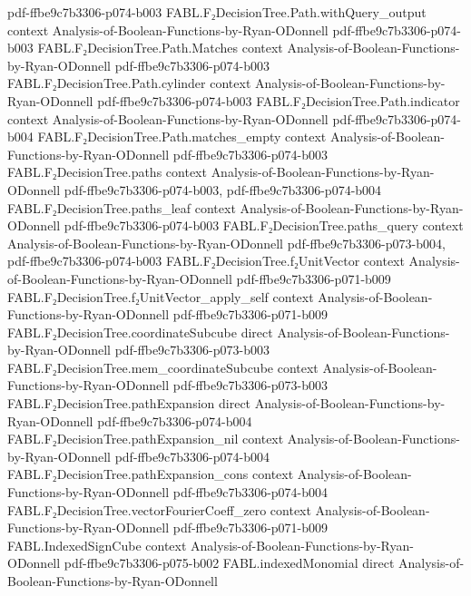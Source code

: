 \begin{theorem}
  {pdf-ffbe9c7b3306-p074-b003}
\proofstep
  {FABL.F₂DecisionTree.Path.withQuery_output}
  {context}
  {Analysis-of-Boolean-Functions-by-Ryan-ODonnell}
  {pdf-ffbe9c7b3306-p074-b003}
\proofstep
  {FABL.F₂DecisionTree.Path.Matches}
  {context}
  {Analysis-of-Boolean-Functions-by-Ryan-ODonnell}
  {pdf-ffbe9c7b3306-p074-b003}
\proofstep
  {FABL.F₂DecisionTree.Path.cylinder}
  {context}
  {Analysis-of-Boolean-Functions-by-Ryan-ODonnell}
  {pdf-ffbe9c7b3306-p074-b003}
\proofstep
  {FABL.F₂DecisionTree.Path.indicator}
  {context}
  {Analysis-of-Boolean-Functions-by-Ryan-ODonnell}
  {pdf-ffbe9c7b3306-p074-b004}
\proofstep
  {FABL.F₂DecisionTree.Path.matches_empty}
  {context}
  {Analysis-of-Boolean-Functions-by-Ryan-ODonnell}
  {pdf-ffbe9c7b3306-p074-b003}
\proofstep
  {FABL.F₂DecisionTree.paths}
  {context}
  {Analysis-of-Boolean-Functions-by-Ryan-ODonnell}
  {pdf-ffbe9c7b3306-p074-b003,
    pdf-ffbe9c7b3306-p074-b004}
\proofstep
  {FABL.F₂DecisionTree.paths_leaf}
  {context}
  {Analysis-of-Boolean-Functions-by-Ryan-ODonnell}
  {pdf-ffbe9c7b3306-p074-b003}
\proofstep
  {FABL.F₂DecisionTree.paths_query}
  {context}
  {Analysis-of-Boolean-Functions-by-Ryan-ODonnell}
  {pdf-ffbe9c7b3306-p073-b004,
    pdf-ffbe9c7b3306-p074-b003}
\proofstep
  {FABL.F₂DecisionTree.f₂UnitVector}
  {context}
  {Analysis-of-Boolean-Functions-by-Ryan-ODonnell}
  {pdf-ffbe9c7b3306-p071-b009}
\proofstep
  {FABL.F₂DecisionTree.f₂UnitVector_apply_self}
  {context}
  {Analysis-of-Boolean-Functions-by-Ryan-ODonnell}
  {pdf-ffbe9c7b3306-p071-b009}
\proofstep
  {FABL.F₂DecisionTree.coordinateSubcube}
  {direct}
  {Analysis-of-Boolean-Functions-by-Ryan-ODonnell}
  {pdf-ffbe9c7b3306-p073-b003}
\proofstep
  {FABL.F₂DecisionTree.mem_coordinateSubcube}
  {context}
  {Analysis-of-Boolean-Functions-by-Ryan-ODonnell}
  {pdf-ffbe9c7b3306-p073-b003}
\proofstep
  {FABL.F₂DecisionTree.pathExpansion}
  {direct}
  {Analysis-of-Boolean-Functions-by-Ryan-ODonnell}
  {pdf-ffbe9c7b3306-p074-b004}
\proofstep
  {FABL.F₂DecisionTree.pathExpansion_nil}
  {context}
  {Analysis-of-Boolean-Functions-by-Ryan-ODonnell}
  {pdf-ffbe9c7b3306-p074-b004}
\proofstep
  {FABL.F₂DecisionTree.pathExpansion_cons}
  {context}
  {Analysis-of-Boolean-Functions-by-Ryan-ODonnell}
  {pdf-ffbe9c7b3306-p074-b004}
\proofstep
  {FABL.F₂DecisionTree.vectorFourierCoeff_zero}
  {context}
  {Analysis-of-Boolean-Functions-by-Ryan-ODonnell}
  {pdf-ffbe9c7b3306-p071-b009}
\proofstep
  {FABL.IndexedSignCube}
  {context}
  {Analysis-of-Boolean-Functions-by-Ryan-ODonnell}
  {pdf-ffbe9c7b3306-p075-b002}
\proofstep
  {FABL.indexedMonomial}
  {direct}
  {Analysis-of-Boolean-Functions-by-Ryan-ODonnell}

\end{theorem}
